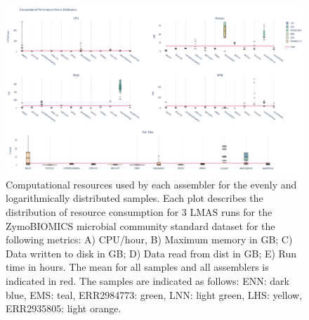 \begin{figure}[h!]
\centering
\includegraphics[width=\textwidth]{figures/chapter 5/Supplemental Figure 2.png}
\caption{Computational resources used by each assembler for the evenly and logarithmically distributed samples. Each plot describes the distribution of resource consumption for 3 LMAS runs for the ZymoBIOMICS microbial community standard dataset for the following metrics: A) CPU/hour, B) Maximum memory in GB; C) Data written to disk in GB; D) Data read from dist in GB; E) Run time in hours. The mean for all samples and all assemblers is indicated in red. The samples are indicated as follows: ENN: dark blue, EMS: teal, ERR2984773: green, LNN: light green, LHS: yellow, ERR2935805: light orange. }
\label{fig:chap5_sup_figure_2}
\end{figure}

